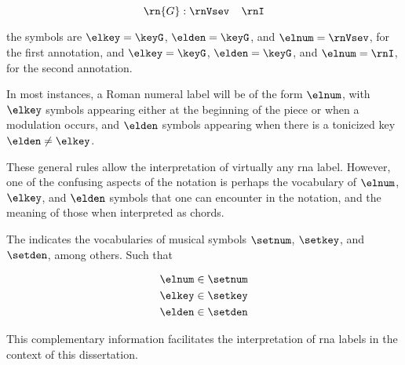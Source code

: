 \begin{equation}
    \rn{G}:\rnVsev \;\;\;\; \rnI
\end{equation}

the symbols are $\elkey=\keyG$, $\elden=\keyG$, and
$\elnum=\rnVsev$, for the first annotation, and
$\elkey=\keyG$, $\elden=\keyG$, and $\elnum=\rnI$, for the
second annotation.

In most instances, a Roman numeral label will be of the form
$\elnum$, with $\elkey$ symbols appearing either at the
beginning of the piece or when a modulation occurs, and
$\elden$ symbols appearing when there is a tonicized key
$\elden \neq \elkey$.

These general rules allow the interpretation of virtually
any \gls{rna} label. However, one of the confusing aspects
of the notation is perhaps the vocabulary of $\elnum$,
$\elkey$, and $\elden$ symbols that one can encounter in the
notation, and the meaning of those when interpreted as
chords.

The 
indicates the vocabularies of musical symbols $\setnum$,
$\setkey$, and $\setden$, among others. Such that

\begin{equation}
    \begin{split}
    \elnum \in \setnum \\
    \elkey \in \setkey \\
    \elden \in \setden
    \end{split}
\end{equation}

This complementary information facilitates the
interpretation of \gls{rna} labels in the context of this
dissertation.
